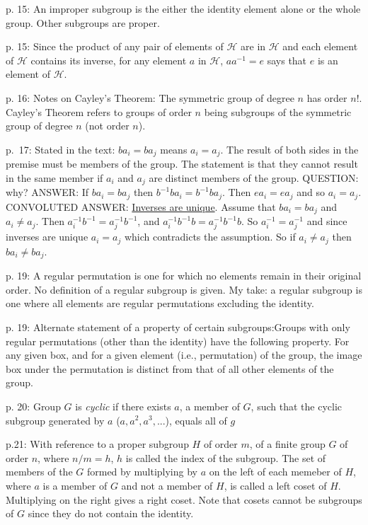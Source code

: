 \documentclass{book}
\begin{document}
p. 15: An improper subgroup is the either the identity element alone
or the whole group. Other subgroups are proper.

p. 15: Since the product of any pair of elements of $\mathcal H$ are
in $\mathcal H$ and each element of $\mathcal H$ contains its inverse,
for any element $a$ in $\mathcal H$, $aa^{-1} = e$ says that $e$ is an
element of $\mathcal H$.

p. 16: Notes on Cayley's Theorem: The symmetric group of degree $n$
has order $n!$. Cayley's Theorem refers to groups of order $n$ being
subgroups of the symmetric group of degree $n$ (not order $n$).

p.\ 17: Stated in the text: $ba_i = ba_j$ means $a_i = a_j$. The
result of both sides in the premise must be members of the group. The
statement is that they cannot result in the same member if $a_i$ and
$a_j$ are distinct members of the group. QUESTION: why? ANSWER: If
$ba_i = ba_j$ then $b^{-1}ba_i = b^{-1}ba_j$. Then $ea_i = ea_j$ and
so $a_i = a_j$. CONVOLUTED ANSWER:
\href{https://planetmath.org/uniquenessofinverseforgroups}{Inverses
  are unique}. Assume that $ba_i = ba_j$ and $a_i \neq a_j$. Then
$a^{-1}_i b^{-1} = a^{-1}_j b^{-1}$, and $a^{-1}_i b^{-1} b = a^{-1}_j
b^{-1} b$. So $a^{-1}_i = a^{-1}_j$ and since inverses are unique $a_i
= a_j$ which contradicts the assumption. So if $a_i \neq a_j$ then
$ba_i \neq ba_j$.

p. 19: A regular permutation is one for which no elements remain in
their original order. No definition of a regular subgroup is given. My
take: a regular subgroup is one where all elements are regular
permutations excluding the identity.

p. 19: Alternate statement of a property of certain
subgroups:\hfil\break Groups with only regular permutations (other
than the identity) have the following property. For any given box,
and for a given element (i.e., permutation) of the group, the image
box under the permutation is distinct from that of all other elements
of the group.

p. 20: Group $G$ is {\it cyclic} if there exists $a$, a member of $G$,
such that the cyclic subgroup generated by $a$ ($a,a^2,a^3,...$),
equals all of $g$

p.21: With reference to a proper subgroup $H$ of order $m$, of a
finite group $G$ of order $n$, where $n/m = h$, $h$ is called the
index of the subgroup. The set of members of the $G$ formed by
multiplying by $a$ on the left of each memeber of $H$, where $a$ is a
member of $G$ and not a member of $H$, is called a left coset of
$H$. Multiplying on the right gives a right coset. Note that cosets
cannot be subgroups of $G$ since they do not contain the identity.
\end{document}
